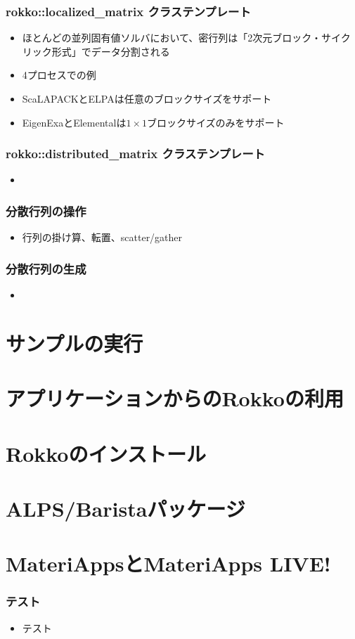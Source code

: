 \begin{frame}
  \frametitle{rokko::localized\_matrix クラステンプレート}
  \begin{itemize}
  \item ほとんどの並列固有値ソルバにおいて、密行列は「2次元ブロック・サイクリック形式」でデータ分割される
  \item 4プロセスでの例
  \item ScaLAPACKとELPAは任意のブロックサイズをサポート
  \item EigenExaとElementalは$1 \times 1$ブロックサイズのみをサポート
  \end{itemize}
\end{frame}

\begin{frame}
  \frametitle{rokko::distributed\_matrix クラステンプレート}
  \begin{itemize}
  \item 
  \end{itemize}
\end{frame}

\begin{frame}
  \frametitle{分散行列の操作}
  \begin{itemize}
  \item 行列の掛け算、転置、scatter/gather
  \end{itemize}
\end{frame}

\begin{frame}
  \frametitle{分散行列の生成}
  \begin{itemize}
  \item 
  \end{itemize}
\end{frame}

\section{サンプルの実行}
\section{アプリケーションからのRokkoの利用}
\section{Rokkoのインストール}
\section{ALPS/Baristaパッケージ}
\section{MateriAppsとMateriApps LIVE!}

\begin{frame}
  \frametitle{テスト}
  \begin{itemize}
  \item テスト
  \end{itemize}
\end{frame}


